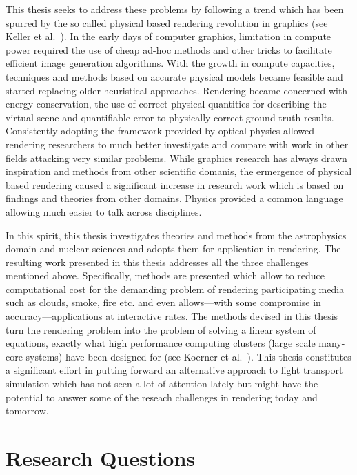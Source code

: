 This thesis seeks to address these problems by following a trend which has been spurred by the so called physical based rendering revolution in graphics (see Keller et al.~\cite{Keller15}). In the early days of computer graphics, limitation in compute power required the use of cheap ad-hoc methods and other tricks to facilitate efficient image generation algorithms. With the growth in compute capacities, techniques and methods based on accurate physical models became feasible and started replacing older heuristical approaches. Rendering became concerned with energy conservation, the use of correct physical quantities for describing the virtual scene and quantifiable error to physically correct ground truth results. Consistently adopting the framework provided by optical physics allowed rendering researchers to much better investigate and compare with work in other fields attacking very similar problems. While graphics research has always drawn inspiration and methods from other scientific domanis, the ermergence of physical based rendering caused a significant increase in research work which is based on findings and theories from other domains. Physics provided a common language allowing much easier to talk across disciplines.

In this spirit, this thesis investigates theories and methods from the astrophysics domain and nuclear sciences and adopts them for application in rendering. The resulting work presented in this thesis addresses all the three challenges mentioned above. Specifically, methods are presented which allow to reduce computational cost for the demanding problem of rendering participating media such as clouds, smoke, fire etc. and even allows---with some compromise in accuracy---applications at interactive rates. The methods devised in this thesis turn the rendering problem into the problem of solving a linear system of equations, exactly what high performance computing clusters (large scale many-core systems) have been designed for (see Koerner et al.~\cite{Koerner17}). This thesis constitutes a significant effort in putting forward an alternative approach to light transport simulation which has not seen a lot of attention lately but might have the potential to answer some of the reseach challenges in rendering today and tomorrow.


\section{Research Questions}

